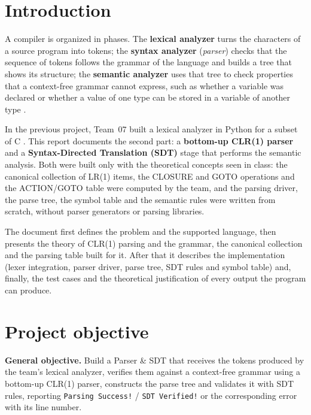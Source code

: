 \documentclass[11pt,letterpaper]{article}
\let\oldsection\section
\renewcommand{\section}{\needspace{8\baselineskip}\oldsection}
\newcommand{\ok}[1]{\textcolor{okgreen}{\texttt{#1}}}
\begin{document}
{\setlength{\parskip}{0pt}\small
\tableofcontents}
\newpage

\section{Introduction}

A compiler is organized in phases. The \textbf{lexical analyzer} turns the
characters of a source program into tokens; the \textbf{syntax analyzer}
(\emph{parser}) checks that the sequence of tokens follows the grammar of the
language and builds a tree that shows its structure; the \textbf{semantic
analyzer} uses that tree to check properties that a context-free grammar
cannot express, such as whether a variable was declared or whether a value of
one type can be stored in a variable of another type \cite{aho2006}.

In the previous project, Team~07 built a lexical analyzer in Python for a
subset of C \cite{lexerrepo}. This report documents the second part: a
\textbf{bottom-up CLR(1) parser} and a \textbf{Syntax-Directed Translation
(SDT)} stage that performs the semantic analysis. Both were built only with
the theoretical concepts seen in class: the canonical collection of LR(1)
items, the CLOSURE and GOTO operations and the ACTION/GOTO table were
computed by the team, and the parsing driver, the parse tree, the symbol
table and the semantic rules were written from scratch, without parser
generators or parsing libraries.

The document first defines the problem and the supported language, then
presents the theory of CLR(1) parsing and the grammar, the canonical
collection and the parsing table built for it. After that it describes the
implementation (lexer integration, parser driver, parse tree, SDT rules and
symbol table) and, finally, the test cases and the theoretical justification
of every output the program can produce.

\section{Project objective}

\textbf{General objective.} Build a Parser \& SDT that receives the tokens
produced by the team's lexical analyzer, verifies them against a context-free
grammar using a bottom-up CLR(1) parser, constructs the parse tree and
validates it with SDT rules, reporting \ok{Parsing Success!} /
\ok{SDT Verified!} or the corresponding error with its line number.
\end{document}
